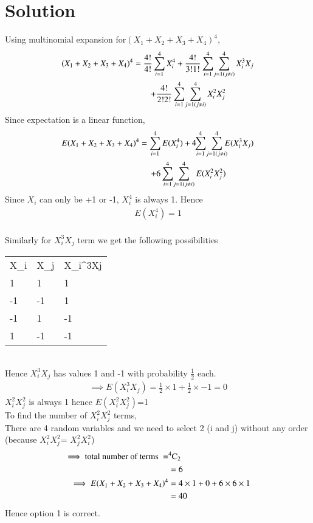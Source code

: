 \documentclass[journal,12pt,twocolumn]{IEEEtran}
\begin{document}
\section{Solution} 
Using multinomial expansion for$(X_{1}+X_{2}+X_{3}+X_{4})^{4}$,\\
\begin{multline}
    (X_{1}+X_{2}+X_{3}+X_{4})^{4}=\frac{4!}{4!}\sum_{i=1}^{4}X_{i}^{4}+\frac{4!}{3!1!}\sum_{i=1}^{4}\!\sum_{j=1(j \neq i)}^{4}X_{i}^{3}X_{j}\\ \hspace{1 in}+\frac{4!}{2!2!}\sum_{i=1}^{4}\!\sum_{j=1(j \neq i)}^{4}X_{i}^{2}X_{j}^{2}\\
\end{multline}
Since expectation is a linear function,
\begin{multline}
    E(X_{1}+X_{2}+X_{3}+X_{4})^{4}=\sum_{i=1}^{4}E(X_{i}^{4})+4\!\!\sum_{i=1}^{4}\!\sum_{j=1(j \neq i)}^{4}\!\!\!E(X_{i}^{3}X_{j})\\ \hspace{1 in}+6\sum_{i=1}^{4}\!\sum_{j=1(j \neq i)}^{4}E(X_{i}^{2}X_{j}^{2})\\
\end{multline}
Since $X_{i}$ can only be +1 or -1, $X_{i}^{4}$ is always 1. Hence 
\begin{align}
E(X_{i}^{4})=1
\end{align}\\
Similarly for $X_{i}^{3}X_{j}$ term we get the following possibilities\\
\begin{table}[h]
\begin{tabular}{lll}
X_{i} & X_{j} & X_{i}^{3}X{j}  \\
1   & 1 & 1 \\
-1   & -1 & 1 \\
-1 & 1 & -1 \\
1 & -1 & -1\\
\end{tabular}
\end{table}\\
Hence $X_{i}^{3}X_{j}$ has values 1 and -1 with probability $\frac{1}{2}$ each.  
\begin{align}
   \implies E(X_{i}^{3}X_{j})=\frac{1}{2}\times1 + \frac{1}{2}\times-1=0
\end{align}
$X_{i}^{2}X_{j}^{2}$ is always 1 hence $E(X_{i}^{2}X_{j}^{2})$=1\\
To find the number of $X_{i}^{2}X_{j}^{2}$ terms, \\
There are 4 random variables and we need to select 2 (i and j) without any order (because $X_{i}^{2}X_{j}^{2}$= $X_{j}^{2}X_{i}^{2}$)\\
\begin{align}
    \implies \text{total number of terms }=& {}^{4}\mathrm{C}_{2}\\
    &=6\\
    \!\!\!\!\!\!\implies E(X_{1}+X_{2}+X_{3}+X_{4})^{4}&=4\times 1+0+6\times6\times1\\
                                         &=40
\end{align}
Hence option 1 is correct.
\end{document}
